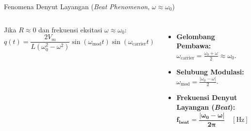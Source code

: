 \documentclass[aspectratio=169,10pt]{beamer}
\begin{document}
\begin{frame}{Fenomena Denyut Layangan (\textit{Beat Phenomenon}, $\omega \approx \omega_0$)}
  \begin{columns}[c]
    Jika $R \approx 0$ dan frekuensi eksitasi $\omega \approx \omega_0$:
    \begin{equation*}
      q(t) = \frac{2 V_m}{L(\omega_0^2 - \omega^2)} \sin(\omega_{\text{mod}} t) \sin(\omega_{\text{carrier}} t)
    \end{equation*}
    \begin{itemize}
      \item \textbf{Gelombang Pembawa:} $\omega_{\text{carrier}} = \frac{\omega_0 + \omega}{2} \approx \omega_0$.
      \item \textbf{Selubung Modulasi:} $\omega_{\text{mod}} = \frac{|\omega_0 - \omega|}{2}$.
      \item \textbf{Frekuensi Denyut Layangan (\textit{Beat}):}
      \begin{equation*}
        \mathbf{f_{\text{beat}} = \frac{|\omega_0 - \omega|}{2\pi}} \quad [\text{Hz}]
      \end{equation*}
    \end{itemize}

    \begin{center}
    \end{center}
  \end{columns}
\end{frame}
\end{document}
